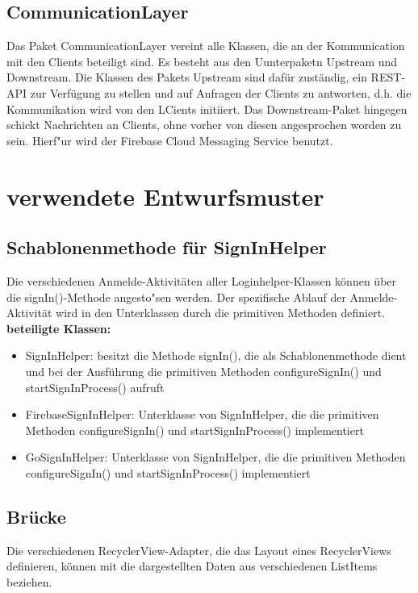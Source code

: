 \documentclass[11pt,a4paper]{report}
\begin{document}
\subsection{CommunicationLayer}
Das Paket CommunicationLayer vereint alle Klassen, die an der Kommunication mit den Clients beteiligt sind. Es besteht aus den Uunterpaketn Upstream und Downstream. Die Klassen des Pakets Upstream sind dafür zuständig, ein REST-API zur Verfügung zu stellen und auf Anfragen der Clients zu antworten, d.h. die Kommunikation wird von den LCients initiiert. Das Downstream-Paket hingegen schickt Nachrichten an Clients, ohne vorher von diesen angesprochen worden zu sein. Hierf"ur wird der Firebase Cloud Messaging Service benutzt.

\section{verwendete Entwurfsmuster}

\subsection{Schablonenmethode für SignInHelper}
Die verschiedenen Anmelde-Aktivitäten aller Loginhelper-Klassen können über die signIn()-Methode angesto"sen werden. Der spezifische Ablauf der Anmelde-Aktivität wird in den Unterklassen durch die primitiven Methoden definiert. \\

\textbf{beteiligte Klassen:}
\begin{itemize}
	\item SignInHelper: besitzt die Methode signIn(), die als Schablonenmethode dient und bei der Ausführung die primitiven Methoden configureSignIn() und startSignInProcess() aufruft
	\item FirebaseSignInHelper: Unterklasse von SignInHelper, die die primitiven Methoden configureSignIn() und startSignInProcess() implementiert
	\item GoSignInHelper: Unterklasse von SignInHelper, die die primitiven Methoden configureSignIn() und startSignInProcess() implementiert
\end{itemize}

\subsection{Brücke}
Die verschiedenen RecyclerView-Adapter, die das Layout eines RecyclerViews definieren, können mit die dargestellten Daten aus verschiedenen ListItems beziehen.
\end{document}
